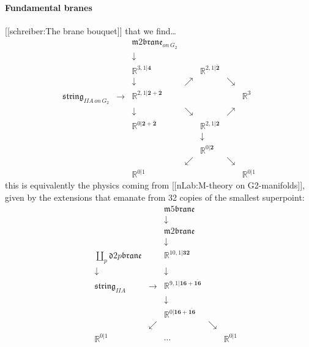 \documentclass[12pt,titlepage]{article}
\newcommand{\itexarray}[1]{\begin{matrix}#1\end{matrix}}
\theoremstyle{plain}
\theoremstyle{definition}
\theoremstyle{remark}
\begin{document}
\hypertarget{fundamental_branes}{}\paragraph*{{Fundamental branes}}\label{fundamental_branes}
[[schreiber:The brane bouquet]] that we find\ldots{}
\begin{displaymath}
\itexarray{
     && \mathfrak{m}2\mathfrak{brane}_{on\,G_2}
     \\
     && \downarrow
     \\
     && \mathbb{R}^{3,1|\mathbf{4}}  &&  \mathbb{R}^{2,1|\overline{\mathbf{2}}}
     \\
     && \downarrow & \nearrow&  & \searrow
     \\
     \mathfrak{string}_{IIA\,on\,G_2} &\longrightarrow& \mathbb{R}^{2,1|\mathbf{2}+\overline{\mathbf{2}}} &&  && \mathbb{R}^{3}
     \\
     && \downarrow &\searrow&  & \nearrow
     \\
     && \mathbb{R}^{0|\mathbf{2}+\overline{\mathbf{2}}} &&  \mathbb{R}^{2,1|\mathbf{2}}
     \\
     && && \downarrow
     \\
     && && \mathbb{R}^{0|\mathbf{2}}
     \\
     && & \swarrow && \searrow
     \\
     && \mathbb{R}^{0|1} && && \mathbb{R}^{0|1}
  }
\end{displaymath}
this is equivalently the physics coming from [[nLab:M-theory on G2-manifolds]], given by the extensions that emanate from 32 copies of the smallest superpoint:
\begin{displaymath}
\itexarray{
     && && \mathfrak{m}5\mathfrak{brane}
     \\
     && && \downarrow
     \\
     && && \mathfrak{m}2\mathfrak{brane}
     \\
     && && \downarrow
     \\
     && \underset{p}{\coprod} \mathfrak{d}{2p}\mathfrak{brane} && \mathbb{R}^{10,1|\mathbf{32}}
     \\
     && \downarrow && \downarrow
     \\
     && \mathfrak{string}_{IIA} &\longrightarrow & \mathbb{R}^{9,1|\mathbf{16}+\overline{\mathbf{16}}}
     \\
     && && \downarrow
     \\
     && && \mathbb{R}^{0|\mathbf{16}+\overline{\mathbf{16}}}
     \\
     && & \swarrow && \searrow
     \\
     && \mathbb{R}^{0|1} && \cdots  && \mathbb{R}^{0|1}
  }
\end{displaymath}
\end{document}
